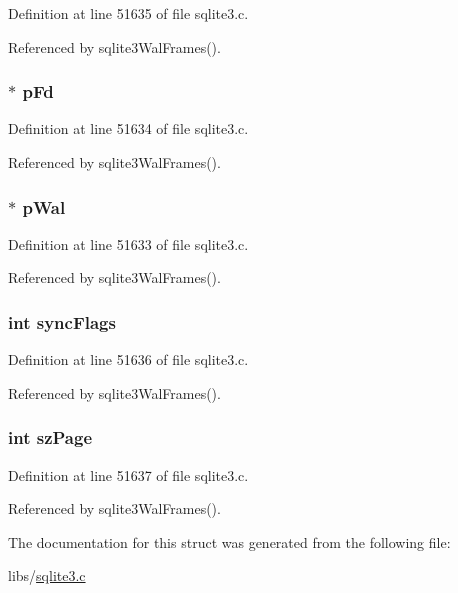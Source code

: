 Definition at line 51635 of file sqlite3.\+c.



Referenced by sqlite3\+Wal\+Frames().

\hypertarget{struct_wal_writer_ae44362cf35caac454319be8c145e374e}{}
\subsubsection[{p\+Fd}]{$\ast$ p\+Fd}\label{struct_wal_writer_ae44362cf35caac454319be8c145e374e}


Definition at line 51634 of file sqlite3.\+c.



Referenced by sqlite3\+Wal\+Frames().

\hypertarget{struct_wal_writer_ac5f3cfd978474a39e7462844ec1a6fe1}{}
\subsubsection[{p\+Wal}]{$\ast$ p\+Wal}\label{struct_wal_writer_ac5f3cfd978474a39e7462844ec1a6fe1}


Definition at line 51633 of file sqlite3.\+c.



Referenced by sqlite3\+Wal\+Frames().

\hypertarget{struct_wal_writer_a3a81127b799c852f4dd1758b0390d48d}{}
\subsubsection[{sync\+Flags}]{\setlength{\rightskip}{0pt plus 5cm}int sync\+Flags}\label{struct_wal_writer_a3a81127b799c852f4dd1758b0390d48d}


Definition at line 51636 of file sqlite3.\+c.



Referenced by sqlite3\+Wal\+Frames().

\hypertarget{struct_wal_writer_a0ead96b04a1cc6dc6ec781782e82d052}{}
\subsubsection[{sz\+Page}]{\setlength{\rightskip}{0pt plus 5cm}int sz\+Page}\label{struct_wal_writer_a0ead96b04a1cc6dc6ec781782e82d052}


Definition at line 51637 of file sqlite3.\+c.



Referenced by sqlite3\+Wal\+Frames().



The documentation for this struct was generated from the following file\+:\begin{DoxyCompactItemize}
\item 
libs/\hyperlink{sqlite3_8c}{sqlite3.\+c}\end{DoxyCompactItemize}
